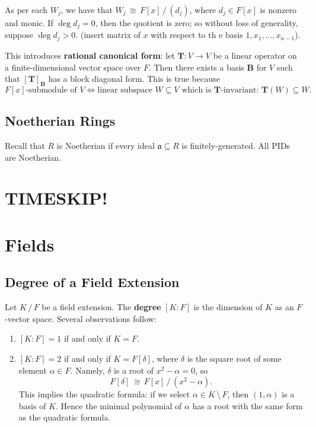 \documentclass[11pt]{article}
\newcommand{\mat}[1]{\mathbf{#1}}
\begin{document}
As per each $W_{j}$, we have that $W_{j} \, \cong \, F[x] \, / \, (d_{j})$, where $d_{j} \in F[x]$ is nonzero and monic. If $\deg d_{j} = 0$, then the quotient is zero; so without loss of generality, suppose $\deg d_{j} > 0$. (insert matrix of $x$ with respect to th e basis $1, x_{1}, \ldots, x_{n - 1}$).

This introduces \textbf{rational canonical form}: let $\mat{T} : V \to V$ be a linear operator on a finite-dimensional vector space over $F$. Then there exists a basis $\mat{B}$ for $V$ such that $[ \mat{T} ]_{\mat{B}}$ has a block diagonal form. This is true because
\[
  \text{$F[x]$-submodule of $V$} \iff \text{linear subspace $W \subseteq V$ which is $\mat{T}$-invariant: $\mat{T}(W) \subseteq W$}.
\]

\subsection{Noetherian Rings}

Recall that $R$ is Noetherian if every ideal $\mathfrak{a} \subseteq R$ is finitely-generated. All PIDs are Noetherian.


\newpage

\section{TIMESKIP!}

\newpage


\section{Fields}


\subsection{Degree of a Field Extension}

Let $K \, / \, F$ be a field extension. The \textbf{degree} $[K : F]$ is the dimension of $K$ as an $F$-vector space. Several observations follow:
\begin{enumerate}
  \item $[K : F] = 1$ if and only if $K = F$.
  \item $[K : F] = 2$ if and only if $K = F[\delta]$, where $\delta$ is the square root of some element $\alpha \in F$. Namely, $\delta$ is a root of $x^{2} - \alpha = 0$, so
  \[
    F[\delta] \, \cong \, F[x] \, / \, (x^{2} - \alpha).
  \]
  This implies the quadratic formula: if we select $\alpha \in K \, \setminus \, F$, then $(1, \alpha)$ is a basis of $K$. Hence the minimal polynomial of $\alpha$ has a root with the same form as the quadratic formula.
\end{enumerate}
\end{document}
